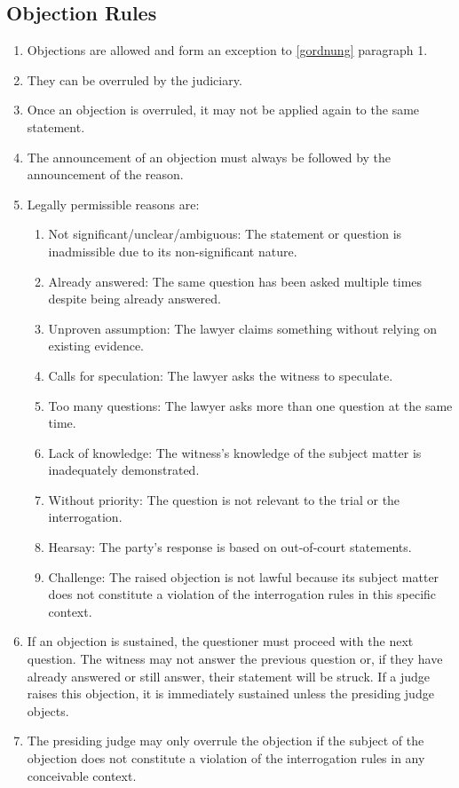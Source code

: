 \documentclass{article}
\begin{document}
\subsection{Objection Rules}\label{eordnung}
\begin{enumerate}[(1)]
    \item Objections are allowed and form an exception to \ref{gordnung} paragraph 1.
    \item They can be overruled by the judiciary.
    \item Once an objection is overruled, it may not be applied again to the same statement.
    \item The announcement of an objection must always be followed by the announcement of the reason.
    \item Legally permissible reasons are:
        \begin{enumerate}[1.]
            \item Not significant/unclear/ambiguous: The statement or question is inadmissible due to its non-significant nature.
            \item Already answered: The same question has been asked multiple times despite being already answered.
            \item Unproven assumption: The lawyer claims something without relying on existing evidence.
            \item Calls for speculation: The lawyer asks the witness to speculate.
            \item Too many questions: The lawyer asks more than one question at the same time.
            \item Lack of knowledge: The witness's knowledge of the subject matter is inadequately demonstrated.
            \item Without priority: The question is not relevant to the trial or the interrogation.
            \item Hearsay: The party's response is based on out-of-court statements.
            \item Challenge: The raised objection is not lawful because its subject matter does not constitute a violation of the interrogation rules in this specific context.
        \end{enumerate}
    \item If an objection is sustained, the questioner must proceed with the next question. The witness may not answer the previous question or, if they have already answered or still answer, their statement will be struck. If a judge raises this objection, it is immediately sustained unless the presiding judge objects.
    \item The presiding judge may only overrule the objection if the subject of the objection does not constitute a violation of the interrogation rules in any conceivable context.
\end{enumerate}
\end{document}
